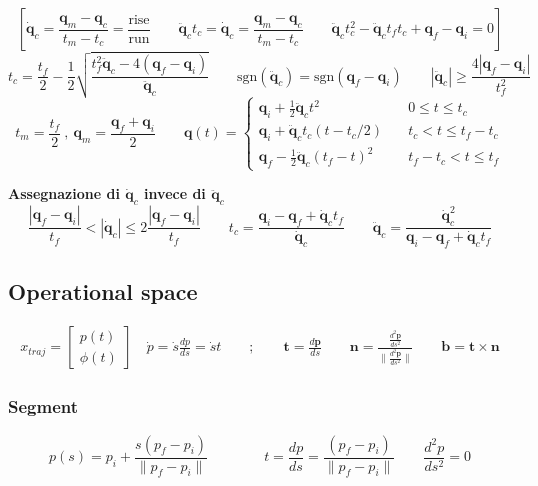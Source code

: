 $$
\left[
\bm{\dot{q}}_c 
= 
\frac{\bm{q}_m - \bm{q}_c}{t_m - t_c}
=
\frac{\text{rise}}{\text{run}}
\qquad
\bm{\ddot{q}}_c t_c
=
\bm{\dot{q}}_c
=
\frac{\bm{q}_m - \bm{q}_c}{t_m - t_c}
\qquad
\bm{\ddot{q}}_ct_c^2
-
\bm{\ddot{q}}_c t_f t_c
+
\bm{q}_f - \bm{q}_i = 0
\right]
$$
\vspace*{10pt}
$$
t_c
=
\frac{t_f}{2} - \frac{1}{2}
\sqrt{
	\frac{t_f^2 \ddot{\bm{q}}_c - 4(\bm{q}_f - \bm{q}_i)}{\bm{\ddot{q}}_c}
}
\qquad
\text{sgn}(\ddot{\bm{q}}_c)
=
\text{sgn}(\bm{q}_f - \bm{q}_i)
\qquad
|\ddot{\bm{q}}_c| \ge \frac{4|\bm{q}_f - \bm{q}_i|}{t_f^2}
$$
\vspace*{10pt}
$$
t_m = \frac{t_f}{2} \ , \ \bm{q}_m = \frac{\bm{q}_f + \bm{q}_i}{2}
\qquad
\bm{q}(t)
=
\begin{cases}
	\bm{q}_i + \frac{1}{2} \ddot{\bm{q}}_c t^2 & \quad 0 \leq t \leq t_c \\
	\bm{q}_i + \ddot{\bm{q}}_c t_c (t - t_c/2) & \quad t_c < t \leq t_f - t_c \\
	\bm{q}_f - \frac{1}{2} \ddot{\bm{q}}_c (t_f - t)^2 & \quad t_f - t_c < t \leq t_f
\end{cases}
$$


\vspace*{10pt}
\textbf{Assegnazione di $\bm{\dot{q}}_c$ invece di $\bm{\ddot{q}}_c$}
\vspace*{5pt}
$$
\frac{|\bm{q}_f - \bm{q}_i|}{t_f}
<
|\bm{\dot{q}}_c|
\leq
2 \frac{|\bm{q}_f - \bm{q}_i|}{t_f}
\qquad
t_c = \frac{\bm{q}_i - \bm{q}_f + \bm{\dot{q}}_c t_f }{\dot{\bm{q}}_c}
\qquad
\bm{\ddot{q}}_c
=
\frac{\bm{\dot{q}}_c^2}{\bm{q}_i - \bm{q}_f + \bm{\dot{q}}_c t_f}
$$





\subsection{Operational space}
\begin{align*}
	x_{traj} = \begin{bmatrix}p(t) \\ \phi(t) \end{bmatrix}
	\quad
	\dot{p} = \dot{s} \frac{dp}{ds} = \dot{s}{t}
	\qquad ; \qquad
	\bm{t} = \frac{d\bm{p}}{ds}
	\qquad
	\bm{n} = \frac{\frac{d^2 \bm{p}}{ds^2}}{\| \frac{d^2 \bm{p}}{ds^2} \|}
	\qquad
	\bm{b} = \bm{t} \times \bm{n}
\end{align*}


\subsubsection{Segment}
$$
p(s) = p_i + \frac{s(p_f - p_i)}{\| p_f - p_i \|}
\qquad \qquad
t = \frac{dp}{ds} = \frac{(p_f - p_i)}{\| p_f - p_i \|}
\qquad
\frac{d^2p}{ds^2} = 0
$$

